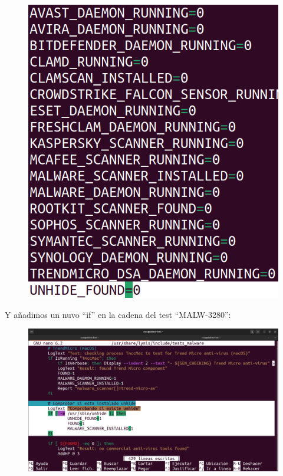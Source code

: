 \documentclass{article}
\begin{document}
\begin{figure}[H]
    \includegraphics[width=\textwidth]{imagenes/macro.png}
\end{figure}

Y añadimos un nuvo ``if'' en la cadena del test ``MALW-3280'':

\begin{figure}[H]
    \includegraphics[width=\textwidth]{imagenes/unhidetest.png}
\end{figure}
\end{document}
